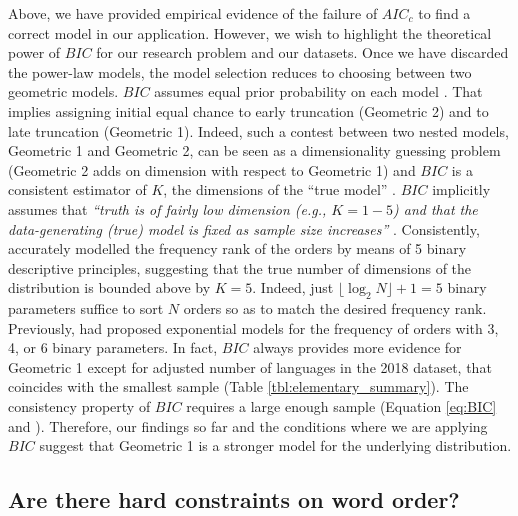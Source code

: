\documentclass[USenglish]{article}
\begin{document}
Above, we have provided empirical evidence of the failure of $AIC_c$ to find a correct model in our application. However, we wish to highlight the theoretical power of $BIC$ for our research problem and our datasets.
Once we have discarded the power-law models, the model selection reduces to choosing between two geometric models. $BIC$ assumes equal prior probability on each model \citep{Burnham2002a}. That implies assigning initial equal chance to early truncation (Geometric 2) and to late truncation (Geometric 1).
Indeed, such a contest between two nested models, Geometric 1 and Geometric 2, can be seen as a dimensionality guessing problem (Geometric 2 adds on dimension with respect to Geometric 1) and $BIC$ is a consistent estimator of $K$, the dimensions of the ``true model'' \citep[p. 284]{Burnham2002a}. $BIC$ implicitly assumes that {\em ``truth is of fairly low dimension (e.g., $K = 1-5$) and that the data-generating (true) model is fixed as sample size increases''} \citep[286]{Burnham2002a}. 
Consistently, \citet{Dryer2018a} accurately modelled the frequency rank of the orders by means of 5 binary descriptive principles, suggesting that the true number of dimensions of the distribution is bounded above by $K = 5$. Indeed, just $\lfloor \log_2 N \rfloor + 1 = 5$ binary parameters suffice to sort $N$ orders so as to match the desired frequency rank. Previously, \citet{Cysouw2010a} had proposed exponential models for the frequency of orders with 3, 4, or 6 binary parameters. In fact, $BIC$ always provides more evidence for Geometric 1 except for adjusted number of languages in the 2018 dataset, that coincides with the smallest sample (Table \ref{tbl:elementary_summary}). The consistency property of $BIC$ requires a large enough sample (Equation \ref{eq:BIC} and \citet[p. 288]{Burnham2002a}). 
Therefore, our findings so far and the conditions where we are applying $BIC$ suggest that Geometric 1 is a stronger model for the underlying distribution.

\subsection{Are there hard constraints on word order?}
\end{document}
